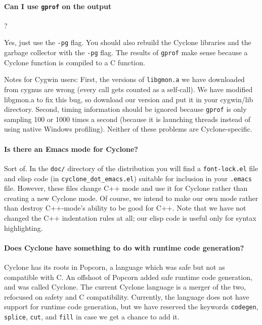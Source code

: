 \paragraph{Can I use \texttt{gprof} on the output}?

Yes, just use the \texttt{-pg} flag.  You should also rebuild the
Cyclone libraries and the garbage collector with the \texttt{-pg}
flag.  The results of \texttt{gprof} make sense because a Cyclone
function is compiled to a C function.

Notes for Cygwin users: First, the versions of \texttt{libgmon.a} we
have downloaded from cygnus are wrong (every call gets counted as a
self-call).  We have modified libgmon.a to fix this bug, so download
our version and put it in your cygwin/lib directory.  Second, timing
information should be ignored because \texttt{gprof} is only sampling
100 or 1000 times a second (because it is launching threads instead of
using native Windows profiling).  Neither of these problems are
Cyclone-specific.

\paragraph{Is there an Emacs mode for Cyclone?}

Sort of.  In the \texttt{doc/} directory of the distribution you will
find a \texttt{font-lock.el} file and elisp code (in
\texttt{cyclone_dot_emacs.el}) suitable for inclusion in your
\texttt{.emacs} file.  However, these files change C++ mode and use it
for Cyclone rather than creating a new Cyclone mode.  Of course, we
intend to make our own mode rather than destroy C++-mode's ability to
be good for C++.  Note that we have not changed the C++ indentation
rules at all; our elisp code is useful only for syntax highlighting.

\paragraph{Does Cyclone have something to do with runtime code generation?}

Cyclone has its roots in Popcorn, a language which was safe but not as
compatible with C\@.  An offshoot of Popcorn added safe runtime code
generation, and was called Cyclone.  The current Cyclone language is a
merger of the two, refocused on safety and C compatibility.
Currently, the language does not have support for runtime code
generation, but we have reserved the keywords \texttt{codegen},
\texttt{splice}, \texttt{cut}, and \texttt{fill} in case we get a
chance to add it.

